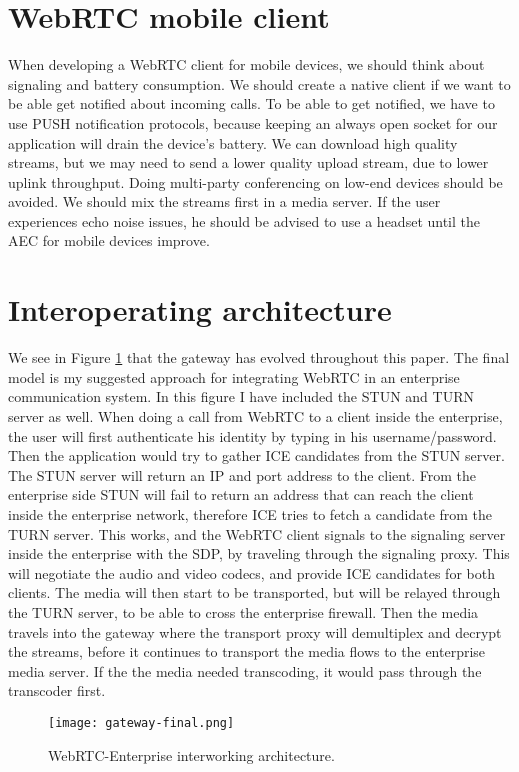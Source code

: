\section{WebRTC mobile client}
When developing a WebRTC client for mobile devices, we should think about signaling and battery consumption. We should create a native client if we want to be able get notified about incoming calls. To be able to get notified, we have to use PUSH notification protocols, because keeping an always open socket for our application will drain the device's battery. We can download high quality streams, but we may need to send a lower quality upload stream, due to lower uplink throughput. Doing multi-party conferencing on low-end devices should be avoided. We should mix the streams first in a media server. If the user experiences echo noise issues, he should be advised to use a headset until the AEC for mobile devices improve.

\section{Interoperating architecture}
We see in Figure \ref{fig:gateway-final} that the gateway has evolved throughout this paper. The final model is my suggested approach for integrating WebRTC in an enterprise communication system. In this figure I have included the STUN and TURN server as well. When doing a call from WebRTC to a client inside the enterprise, the user will first authenticate his identity by typing in his username/password. Then the application would try to gather ICE candidates from the STUN server. The STUN server will return an IP and port address to the client. From the enterprise side STUN will fail to return an address that can reach the client inside the enterprise network, therefore ICE tries to fetch a candidate from the TURN server. This works, and the WebRTC client signals to the signaling server inside the enterprise with the SDP, by traveling through the signaling proxy. This will negotiate the audio and video codecs, and provide ICE candidates for both clients. The media will then start to be transported, but will be relayed through the TURN server, to be able to cross the enterprise firewall. Then the media travels into the gateway where the transport proxy will demultiplex and decrypt the streams, before it continues to transport the media flows to the enterprise media server. If the the media needed transcoding, it would pass through the transcoder first.
\\
\begin{figure}[here]
\centerline{\texttt{[image: gateway-final.png]}}
\caption{WebRTC-Enterprise interworking architecture.}
\label{fig:gateway-final}
\end{figure}


